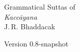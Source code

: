 \begin{titlepage}
\setcounter{page}{1}
{\noindent\fontsize{26pt}{26pt}\upshape Grammatical Suttas of}\\[2\baselineskip]
{\noindent\fontsize{46pt}{46pt}\itshape Kaccāyana}\\[8\baselineskip]
{\LARGE J.\,R. Bhaddacak}\par
{}
{\noindent\ttfamily Version 0.8-snapshot}
\end{titlepage}
\endinput
